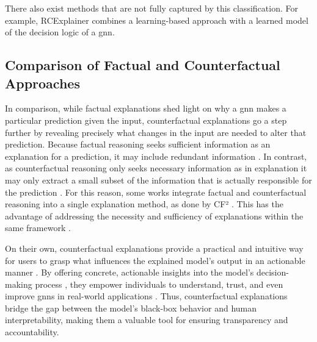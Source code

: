 There also exist methods that are not fully captured by this classification. For example, RCExplainer \cite{bajaj_robust_2021} combines a learning-based approach with a learned model of the decision logic of a \gls{gnn}.


\subsection{Comparison of Factual and Counterfactual Approaches}
\label{s_ExplainingGNNs_Comparison}

In comparison, while factual explanations shed light on why a \gls{gnn} makes a particular prediction given the input, counterfactual explanations go a step further by revealing precisely what changes in the input are needed to alter that prediction. Because factual reasoning seeks sufficient information as an explanation for a prediction, it may include redundant information \cite{tan_learning_2022}. In contrast, as counterfactual reasoning only seeks necessary information as in explanation it may only extract a small subset of the information that is actually responsible for the prediction \cite{tan_learning_2022}. For this reason, some works integrate factual and counterfactual reasoning into a single explanation method, as done by CF² \cite{tan_learning_2022}. This has the advantage of addressing the necessity and sufficiency of explanations within the same framework \cite{tan_learning_2022}.

On their own, counterfactual explanations provide a practical and intuitive way for users to grasp what influences the explained model's output in an actionable manner \cite{lucic_cf-gnnexplainer_2022}. By offering concrete, actionable insights into the model's decision-making process \cite{lucic_cf-gnnexplainer_2022}, they empower individuals to understand, trust, and even improve \glspl{gnn} in real-world applications \cite{prado-romero_survey_2023}. Thus, counterfactual explanations bridge the gap between the model's black-box behavior and human interpretability, making them a valuable tool for ensuring transparency and accountability.
